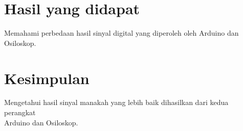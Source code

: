\section{Hasil yang didapat}
Memahami perbedaan hasil sinyal digital yang diperoleh oleh Arduino dan Osiloskop.

\section{Kesimpulan}
Mengetahui hasil sinyal manakah yang lebih baik dihasilkan dari kedua perangkat \\Arduino dan Osiloskop.
